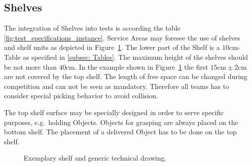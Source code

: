 \subsection{Shelves}\label{sec:Shelves}

The integration of Shelves into tests is according the table \ref{fig:test_specifications_instance}. Service Areas may foresee the use of shelves and shelf units as depicted in Figure~\ref{fig:shelf}. The lower part of the Shelf is a $10\si{\centi\meter}$-Table as specified in \ref{subsec: Tables}.
The maximum height of the shelves should be not more than $40\si{\centi\meter}$. In the example shown in Figure~\ref{fig:shelf} the first $15 \si{\centi\meter}\pm 2\si{\centi\meter} $ are not covered by the top shelf. The length of free space can be changed during competition and can not be seen as mandatory. Therefore all teams has to consider special picking behavior to avoid collision.  

The top shelf surface may be specially designed in order to serve specific purposes, e.g.\, holding Objects. Objects for grasping are always placed on the bottom shelf. The placement of a delivered Object has to be done on the top shelf.  

\begin{figure}[h!]
	\centering
	\hspace{0.05\textwidth}
	\caption{Exemplary shelf and generic technical drawing.}%
	\label{fig:shelf}
\end{figure}


